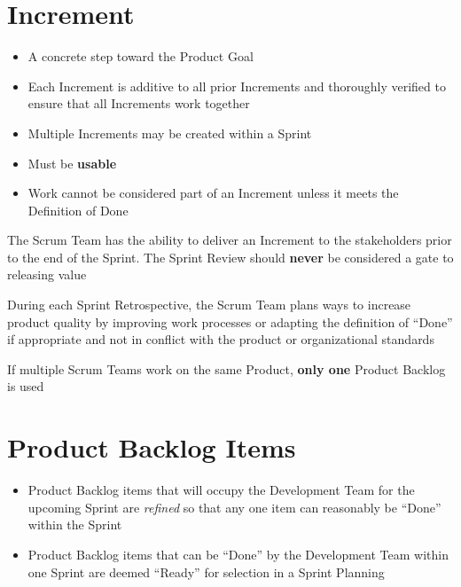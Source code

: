 \documentclass[a4paper,11pt,twocolumn]{article}
\begin{document}
\section*{Increment}
\begin{itemize}
	\item A concrete step toward the Product Goal
	\item Each Increment is additive to all prior Increments and thoroughly verified to ensure that all Increments work together
	\item Multiple Increments may be created within a Sprint
	\item Must be \textbf{usable}
	\item Work cannot be considered part of an Increment unless it meets the Definition of Done
\end{itemize}

\begin{tcolorbox}[colback=black!8!white,colframe=gray!50!black,title=Note,sharp corners,fonttitle=\normalsize\bfseries,fontupper=\normalsize,left=0.7em,right=0.7em]
	The Scrum Team has the ability to deliver an Increment to the stakeholders prior to the end of the Sprint. The Sprint Review should \textbf{never} be considered a gate to releasing value
\end{tcolorbox}


\begin{tcolorbox}[colback=black!8!white,colframe=gray!50!black,title=Note,sharp corners,fonttitle=\normalsize\bfseries,fontupper=\normalsize,left=0.7em,right=0.7em]
	During each Sprint Retrospective, the Scrum Team plans ways to increase product quality by improving work processes or adapting the definition of ``Done'' if appropriate and not in conflict with the product or organizational standards
\end{tcolorbox}


\begin{tcolorbox}[colback=black!8!white,colframe=gray!50!black,title=Note,sharp corners,fonttitle=\normalsize\bfseries,fontupper=\normalsize,left=0.7em,right=0.7em]
	If multiple Scrum Teams work on the same Product, \textbf{only one} Product Backlog is used
\end{tcolorbox}

\section*{Product Backlog Items}
\begin{itemize}
	\item Product Backlog items that will occupy the Development Team for the upcoming Sprint are \textit{refined} so that any one item can reasonably be ``Done'' within the Sprint
	\item Product Backlog items that can be ``Done'' by the Development Team within one Sprint are deemed ``Ready'' for selection in a Sprint Planning
\end{itemize}
\end{document}
